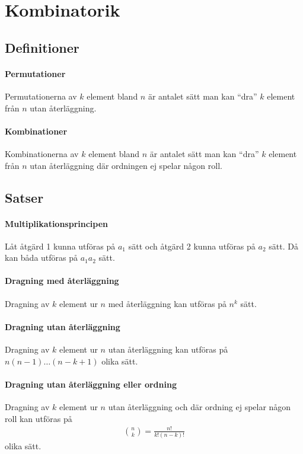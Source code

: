 \section{Kombinatorik}

\subsection{Definitioner}

\paragraph{Permutationer}
Permutationerna av $k$ element bland $n$ är antalet sätt man kan ``dra'' $k$ element från $n$ utan återläggning.

\paragraph{Kombinationer}
Kombinationerna av $k$ element bland $n$ är antalet sätt man kan ``dra'' $k$ element från $n$ utan återläggning där ordningen ej spelar någon roll.

\subsection{Satser}

\paragraph{Multiplikationsprincipen}
Låt åtgärd 1 kunna utföras på $a_1$ sätt och åtgärd 2 kunna utföras på $a_2$ sätt. Då kan båda utföras på $a_1a_2$ sätt.

\proof

\paragraph{Dragning med återläggning}
Dragning av $k$ element ur $n$ med återläggning kan utföras på $n^k$ sätt.

\proof

\paragraph{Dragning utan återläggning}
Dragning av $k$ element ur $n$ utan återläggning kan utföras på $n(n - 1)\dots (n - k +1)$ 
olika sätt.

\proof

\paragraph{Dragning utan återläggning eller ordning}
Dragning av $k$ element ur $n$ utan återläggning och där ordning ej spelar någon roll kan utföras på
\begin{align*}
	\binom{n}{k} = \frac{n!}{k!(n - k)!}
\end{align*}
olika sätt.

\proof